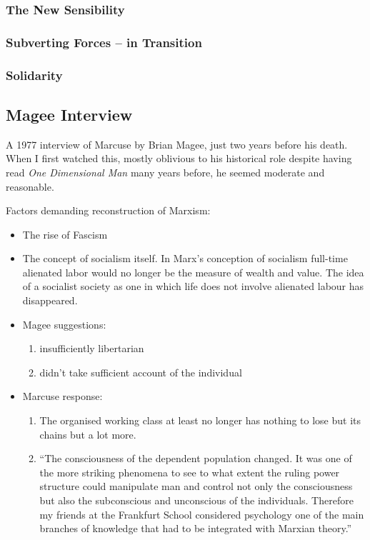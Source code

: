 \documentclass[10pt,titlepage]{book}
\begin{document}
\subsubsection{The New Sensibility}
\subsubsection{Subverting Forces – in Transition}
\subsubsection{Solidarity}

\subsection{Magee Interview \cite{marcuse-magee}}

A 1977 interview of Marcuse by Brian Magee, just two years before his death.
When I first watched this, mostly oblivious to his historical role despite having read \emph{One Dimensional Man} many years before, he seemed moderate and reasonable.

Factors demanding reconstruction of Marxism:

\begin{itemize}
\item The rise of Fascism
\item The concept of socialism itself.
  In Marx's conception of socialism full-time alienated labor would no longer be the measure of wealth and value.
  The idea of a socialist society as one in which life does not involve alienated labour has disappeared.
\item Magee suggestions:
  \begin{enumerate}
  \item insufficiently libertarian
    \item didn't take sufficient account of the individual
    \end{enumerate}
\item Marcuse response:
  \begin{enumerate}
  \item The organised working class at least no longer has nothing to lose but its chains but a lot more.
    \item ``The consciousness of
      the dependent population changed.
It was one of the more striking phenomena to see to what extent the ruling power
structure could manipulate man and control not only the consciousness
but also the subconscious and unconscious of the individuals.
Therefore my friends at the Frankfurt School considered psychology one of the main
branches of knowledge that had to be integrated with Marxian theory.''
    \end{enumerate}
\end{itemize}
\end{document}
